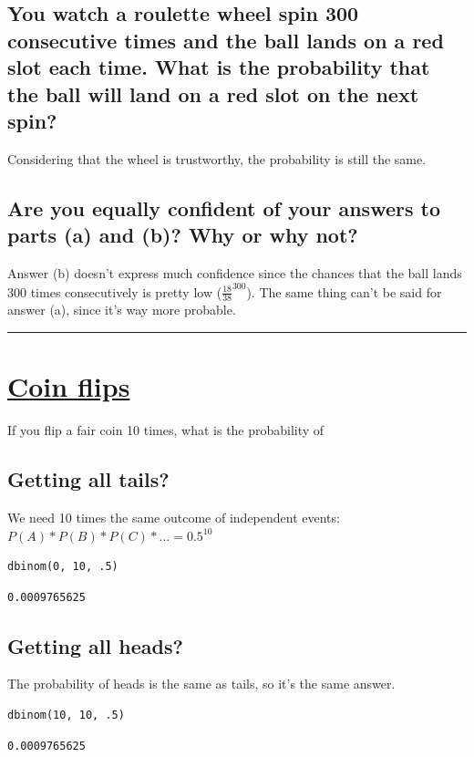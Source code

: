 \documentclass[11pt]{article}
\begin{document}
\subsection{You watch a roulette wheel spin 300 consecutive times and the ball lands on a red slot each time. What is the probability that the ball will land on a red slot on the next spin?}
\label{sec:org77499b9}
Considering that the wheel is trustworthy, the probability is still the same.
\subsection{Are you equally confident of your answers to parts (a) and (b)? Why or why not?}
\label{sec:org2631391}
Answer (b) doesn't express much confidence since the chances that the ball lands 300 times consecutively is pretty low (\(\frac{18}{38}^{300}\)). The same thing can't be said for answer (a), since it's way more probable.

\noindent\rule{\textwidth}{0.5pt}

\section{\underline{Coin flips}}
\label{sec:orgd1a8453}
If you flip a fair coin 10 times, what is the probability of
\subsection{Getting all tails?}
\label{sec:org6c5b4b4}
We need 10 times the same outcome of independent events: \(P(A)*P(B)*P(C)*... = 0.5^{10}\)

\begin{verbatim}
dbinom(0, 10, .5)
\end{verbatim}

\begin{verbatim}
0.0009765625
\end{verbatim}

\subsection{Getting all heads?}
\label{sec:orgba31a6c}
The probability of heads is the same as tails, so it's the same answer.

\begin{verbatim}
dbinom(10, 10, .5)
\end{verbatim}

\begin{verbatim}
0.0009765625
\end{verbatim}
\end{document}

